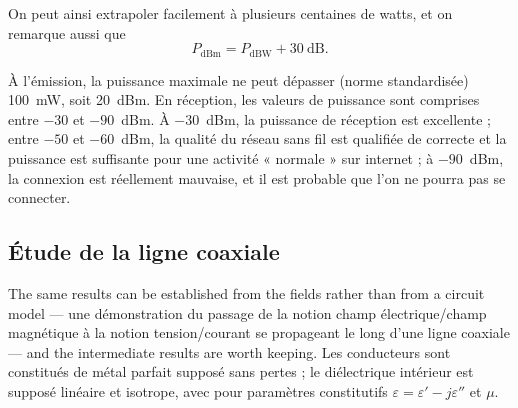 On peut ainsi extrapoler facilement à plusieurs centaines de watts, et on
remarque aussi que
\[
  \boxed{\; P_{\mathrm{dBm}} = P_{\mathrm{dBW}} + 30\ \mathrm{dB}. \;}
\]

\begin{example}
  À l'émission, la puissance maximale ne peut dépasser (norme standardisée)
  100~mW, soit 20~dBm. En réception, les valeurs de puissance sont comprises
  entre $-30$ et $-90$~dBm. À $-30$~dBm, la puissance de réception est
  excellente ; entre $-50$ et $-60$~dBm, la qualité du réseau sans fil est
  qualifiée de correcte et la puissance est suffisante pour une activité
  « normale » sur internet ; à $-90$~dBm, la connexion est réellement mauvaise,
  et il est probable que l'on ne pourra pas se connecter.
\end{example}

\subsection{Étude de la ligne coaxiale}
The same results can be established from the fields rather than from a circuit
model --- une démonstration du passage de la notion champ électrique/champ
magnétique à la notion tension/courant se propageant le long d'une ligne
coaxiale --- and the intermediate results are worth keeping. Les conducteurs
sont constitués de métal parfait supposé sans pertes ; le diélectrique
intérieur est supposé linéaire et isotrope, avec pour paramètres constitutifs
$\varepsilon = \varepsilon' - j\varepsilon''$ et $\mu$.

